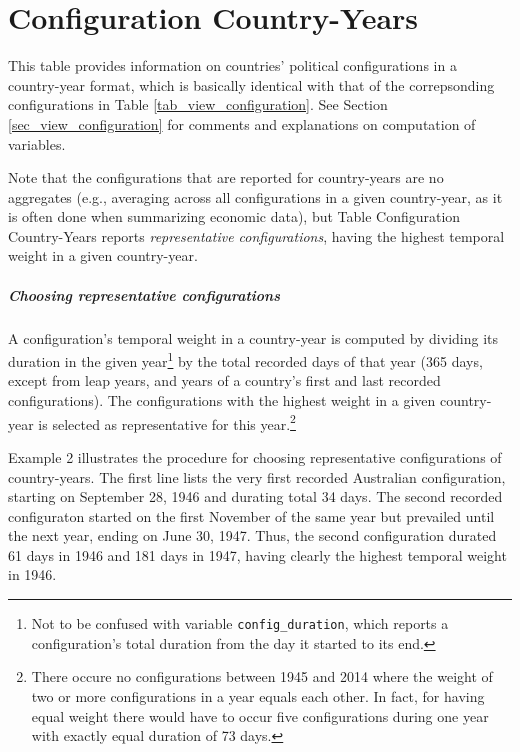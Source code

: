 \section{Configuration Country-Years}\label{sec_view_configuration_country-years}

This table provides information on countries' political configurations in a country-year format, which is basically identical with that of the correpsonding configurations in Table \ref{tab_view_configuration}. See Section \ref{sec_view_configuration} for comments and explanations on computation of variables.

Note that the configurations that are reported for country-years are no aggregates (e.g., averaging across all configurations in a given country-year, as it is often done when summarizing economic data),
but Table Configuration Country-Years reports \emph{representative configurations}, having the highest temporal weight in a given country-year. 

\subparagraph{Choosing representative configurations}\label{choosing_rep_configs}
A configuration's temporal weight in a country-year is computed by dividing its duration in the given year\footnote{Not to be confused with variable \texttt{\smallfont config\_duration}, which reports a configuration's total duration from the day it started to its end.} by the total recorded days of that year (365 days, except from leap years, and years of a country's first and last recorded configurations).
The configurations with the highest weight in a given country-year is selected as representative for this year.\footnote{There occure no configurations between 1945 and 2014 where the weight of two or more configurations in a year equals each other. In fact, for having equal weight there would have to occur five configurations during one year with exactly equal duration of 73 days.}
\begin{table}[h!]
\centering\footnotesize
\caption*{Example 2: Duration and temporal weight of configurations in Australia, 1946 to 1949.}

\end{table}

Example 2 illustrates the procedure for choosing representative configurations of country-years.
The first line lists the very first recorded Australian configuration, starting on September 28, 1946 and durating total 34 days. 
The second recorded configuraton started on the first November of the same year but prevailed until the next year, ending on June 30, 1947. Thus, the second configuration durated 61 days in 1946 and 181 days in 1947, having clearly the highest temporal weight in 1946.

